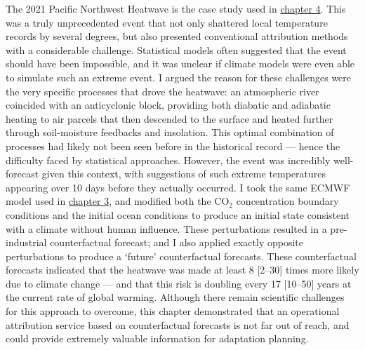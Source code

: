   The 2021 Pacific Northwest Heatwave is the case study used in \hyperref[ch4]{chapter 4}. This was a truly unprecedented event that not only shattered local temperature records by several degrees, but also presented conventional attribution methods with a considerable challenge. Statistical models often suggested that the event should have been impossible, and it was unclear if climate models were even able to simulate such an extreme event. I argued the reason for these challenges were the very specific processes that drove the heatwave: an atmospheric river coincided with an anticyclonic block, providing both diabatic and adiabatic heating to air parcels that then descended to the surface and heated further through soil-moisture feedbacks and insolation. This optimal combination of processes had likely not been seen before in the historical record --- hence the difficulty faced by statistical approaches. However, the event was incredibly well-forecast given this context, with suggestions of such extreme temperatures appearing over 10 days before they actually occurred. I took the same ECMWF model used in \hyperref[ch3]{chapter 3}, and modified both the CO$_2$ concentration boundary conditions and the initial ocean conditions to produce an initial state consistent with a climate without human influence. These perturbations resulted in a pre-industrial counterfactual forecast; and I also applied exactly opposite perturbations to produce a `future' counterfactual forecasts. These counterfactual forecasts indicated that the heatwave was made at least 8 [2--30] times more likely due to climate change --- and that this risk is doubling every 17 [10--50] years at the current rate of global warming. Although there remain scientific challenges for this approach to overcome, this chapter demonstrated that an operational attribution service based on counterfactual forecasts is not far out of reach, and could provide extremely valuable information for adaptation planning.

